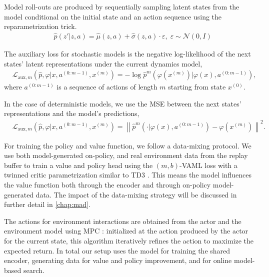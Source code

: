 Model roll-outs are produced by sequentially sampling latent states from the model conditional on the initial state and an action sequence using the reparametrization trick. 
\begin{align}
&\hat{p}(\hat{z}'|z,a)=\hat{\mu}(z,a) + \hat{\sigma}(z,a)\cdot\varepsilon,\; \varepsilon \sim \mathcal{N}(0,I)
\end{align}

The auxiliary loss for stochastic models is the negative log-likelihood of the next states' latent representations under the current dynamics model,
\begin{align}
    &\mathcal{L}_{\mathrm{aux},m}\left(\hat{p},\varphi\Big|x,a^{(0:m-1)},x^{(m)}\right) =-\log \hat{p}^m\left(\varphi(x^{(m)})\Big|\varphi(x),a^{(0:m-1)}\right),
\end{align}
where $a^{(0:m-1)}$ is a sequence of actions of length $m$ starting from state $x^{(0)}$.

In the case of deterministic models, we use the MSE between the next states' representations and the model's predictions,
\begin{align}
    &\mathcal{L}_{\mathrm{aux},m}\left(\hat{p},\varphi\Big|x,a^{(0:m-1)},x^{(m)}\right) =\left\|\hat{p}^m\left(\cdot\Big|\varphi(x),a^{(0:m-1)}\right)-\varphi(x^{(m)})\right\|^2.
\end{align}

For training the policy and value function, we follow a data-mixing protocol.
We use both model-generated on-policy, and real environment data from the replay buffer to train a value and policy head using the $(m,b)$-VAML loss with a twinned critic parametrization similar to TD3  \parencite{fujimoto2018addressing}.
This means the model influences the value function both through the encoder and through on-policy model-generated data.
The impact of the data-mixing strategy will be discussed in further detail in \autoref{chap:mad}.

The actions for environment interactions are obtained from the actor and the environment model using MPC \parencite{hansen2022temporal}: initialized at the action produced by the actor for the current state, this algorithm iteratively refines the action to maximize the expected return.
In total our setup uses the model for training the shared encoder, generating data for value and policy improvement, and for online model-based search.

